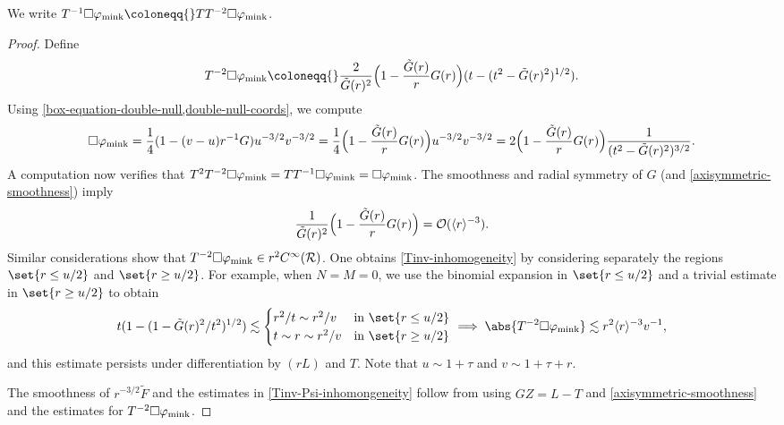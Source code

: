 \documentclass[10pt, reqno]{amsart}
\begin{document}
\begin{remark}
We write \(T^{-1}\Box{}\varphi{}_{\textnormal{mink}}
\coloneqq{}TT^{-2}\Box{}\varphi{}_{\textnormal{mink}}\).
\end{remark}
\begin{proof}
Define
\begin{equation}
T^{-2}\Box{}\varphi{}_{\textnormal{mink}} \coloneqq{} \frac{2}{\tilde{G}(r)^2}\Bigl(1 - \frac{\tilde{G}(r)}{r}G(r)\Bigr)(t-(t^2-\tilde{G}(r)^2)^{1/2}).
\end{equation}
Using \cref{box-equation-double-null,double-null-coords}, we compute
\begin{equation}
\Box{}\varphi{}_{\textnormal{mink}} = \frac{1}{4}(1 - (v-u)r^{-1}G)u^{-3/2}v^{-3/2} = \frac{1}{4}\Bigl(1-\frac{\tilde{G}(r)}{r}G(r)\Bigr)u^{-3/2}v^{-3/2} = 2\Bigl(1-\frac{\tilde{G}(r)}{r}G(r)\Bigr) \frac{1}{(t^2-\tilde{G}(r)^2)^{3/2}}.
\end{equation}
A computation now verifies that \(T^2T^{-2}\Box{}\varphi{}_{\textnormal{mink}} =
TT^{-1}\Box{}\varphi_{\textnormal{mink}} = \Box{}\varphi_{\textnormal{mink}}\).
The smoothness and radial symmetry of \(G\) (and \cref{axisymmetric-smoothness}) imply
\begin{equation}
\frac{1}{\tilde{G}(r)^2}\Bigl(1- \frac{\tilde{G}(r)}{r}G(r)\Bigr)=\mathcal{O}(\langle{}r\rangle{}^{-3}).
\end{equation}
Similar considerations show that \(T^{-2}\Box{}\varphi_{\textnormal{mink}}\in
r^2C^\infty(\mathcal{R})\). One obtains \cref{Tinv-inhomogeneity} by considering
separately the regions \(\set{r\le u/2}\) and \(\set{r\ge u/2}\). For example,
when \(N = M = 0\), we use the binomial expansion in \(\set{r\le u/2}\) and a
trivial estimate in \(\set{r\ge u/2}\) to obtain
\begin{equation}
t(1 - (1-\tilde{G}(r)^2/t^2)^{1/2})\lesssim \begin{cases}
r^2/t\sim r^2/v &\textnormal{in }\set{r\le u/2} \\
t\sim r\sim r^2/v&\textnormal{in }\set{r\ge u/2} \\
\end{cases}\implies \abs{T^{-2}\Box{}\varphi{}_{\textnormal{mink}}}\lesssim r^2\langle{}r\rangle^{-3}v^{-1},
\end{equation}
and this estimate persists under differentiation by \((rL)\) and \(T\). Note
that \(u\sim 1+\tau{}\) and \(v\sim 1+\tau{} + r\).

The smoothness of \(r^{-3/2}\tilde{F}\) and the estimates in \cref{Tinv-Psi-inhomongeneity} follow
from using \(GZ = L - T\) and \cref{axisymmetric-smoothness} and the estimates for \(T^{-2}\Box{}\varphi_{\textnormal{mink}}\).
\end{proof}
\end{document}
